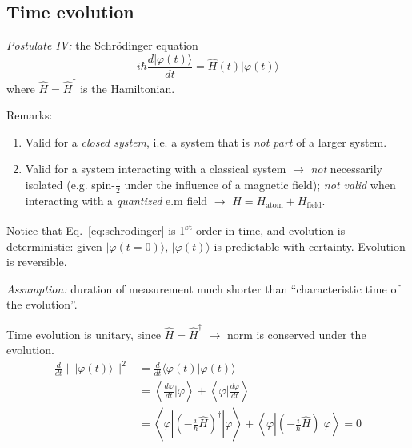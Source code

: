 \documentclass[12pt]{article}
\begin{document}
\subsection{Time evolution}

\emph{Postulate IV:} the Schrödinger equation
\begin{equation}
\boxed{
i \hbar \frac{d|\varphi(t)\rangle}{d t} = 
\hat{H}(t) |\varphi(t)\rangle
}
\label{eq:schrodinger}
\end{equation}
where $\hat{H} = \hat{H}^{\dagger}$ is the Hamiltonian.

Remarks:
\begin{enumerate}
\item Valid for a \emph{closed system}, i.e. a system that is \emph{not part} of a larger system.
\item Valid for a system interacting with a classical 
system $\to$ \emph{not} necessarily isolated (e.g. spin-$\frac{1}{2}$
under the influence of a magnetic field);
\emph{not valid} when interacting with a \emph{quantized}
e.m field $\to$ $H = H_\textrm{atom} + H_\textrm{field}$. 
\end{enumerate}

Notice that Eq.~\eqref{eq:schrodinger} is 1\textsuperscript{st} order in time, and evolution is deterministic: given \mbox{$|\varphi(t=0)\rangle$}, $|\varphi(t)\rangle$ is predictable with certainty. Evolution is reversible.

\bigskip

\emph{Assumption:} duration of measurement much shorter
than ``characteristic time of the evolution''.

Time evolution is unitary, since $\hat{H} = \hat{H}^{\dagger}$ $\to$ norm is conserved under the evolution.
\begin{equation}
\begin{aligned} \frac{d}{d t} \||\varphi(t)\rangle \|^{2} &=\frac{d}{d t}\langle\varphi(t) | \varphi(t)\rangle \\ &=\left\langle\frac{d \varphi}{d t} | \varphi\right\rangle+\left\langle\varphi | \frac{d \varphi}{d t}\right\rangle\\
&=\left\langle\varphi \left|\left(-\frac{i}{\hbar} \hat{H}\right)^{\dagger}\right|\varphi\right\rangle+\left\langle\varphi\left|\left(-\frac{i}{\hbar} \hat{H}\right)\right| \varphi\right\rangle
=0
\end{aligned}
\end{equation}
\end{document}
